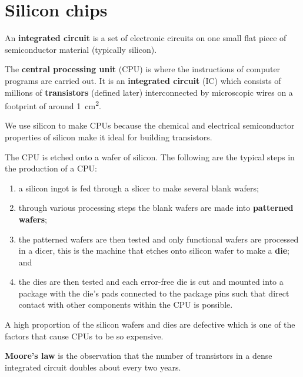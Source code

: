 \section{Silicon chips}

\begin{definition}
    An \textbf{integrated circuit} is a set of electronic circuits on one small flat piece of semiconductor material (typically silicon).
\end{definition}
 
\begin{definition}
    The \textbf{central processing unit} (CPU) is where the instructions of computer programs are carried out. It is an \textbf{integrated circuit} (IC) which consists of millions of \textbf{transistors} (defined later) interconnected by microscopic wires on a footprint of around \SI{1}{\centi\meter\squared}.
\end{definition}

\begin{remark}
    We use silicon to make CPUs because the chemical and electrical semiconductor properties of silicon make it ideal for building transistors.
\end{remark}

The CPU is etched onto a wafer of silicon. The following are the typical steps in the production of a CPU:

\begin{enumerate}
    \item a silicon ingot is fed through a slicer to make several blank wafers;
    \item through various processing steps the blank wafers are made into \textbf{patterned wafers};
    \item the patterned wafers are then tested and only functional wafers are processed in a dicer, this is the machine that etches onto silicon wafer to make a \textbf{die}; and
    \item the dies are then tested and each error-free die is cut and mounted into a package with the die's pads connected to the package pins such that direct contact with other components within the CPU is possible.
\end{enumerate}

A high proportion of the silicon wafers and dies are defective which is one of the factors that cause CPUs to be so expensive.

\begin{proposition}
    \textbf{Moore's law} is the observation that the number of transistors in a dense integrated circuit doubles about every two years.
\end{proposition}

